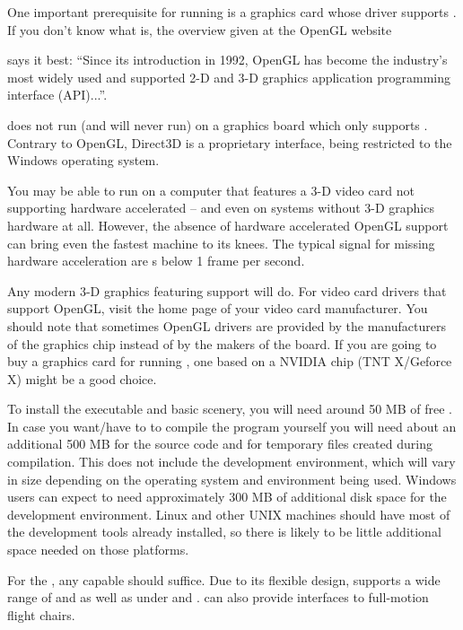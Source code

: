 One important prerequisite for running \FlightGear{} is a graphics card whose driver supports
. If you don't know what  is, the overview given at the OpenGL website
\medskip

\medskip

\noindent
 says it best: ``Since its introduction in 1992, OpenGL has become the
industry's most widely used and supported 2-D and 3-D graphics application programming
interface (API)...''.

\FlightGear{} does not run (and will never run) on a graphics board which only supports
. Contrary to OpenGL, Direct3D is a proprietary interface, being restricted to
the Windows operating system.

You may be able to run \FlightGear{} on a computer that features a 3-D video card not
supporting hardware accelerated  -- and even on systems without 3-D
graphics hardware at all. However, the absence of hardware accelerated OpenGL support can bring even the fastest machine to its knees. The typical signal for missing hardware acceleration
are s below 1 frame per second.

Any modern 3-D graphics featuring  support will do. For
 video card drivers that support OpenGL, visit the home page of your video
card manufacturer. You should note that sometimes OpenGL drivers
are provided by the manufacturers of the graphics chip instead of by the makers of the
board. If you are going to buy a graphics card for running \FlightGear{}, one based on a
NVIDIA chip (TNT X/Geforce X) might be a good choice.

To install the executable and basic scenery, you will need around 50 MB of free . In case you want/have to to compile the program yourself you will need about an additional
500 MB for the source code and for temporary files created during compilation. This does not
include the development environment, which will vary in size depending on the operating system
and environment being used.  Windows users can expect to need approximately 300 MB of additional
disk space for the development environment.  Linux and other UNIX machines should have most of
the development tools already installed, so there is likely to be little additional space
needed on those platforms.

For the , any capable  should suffice.
Due to its flexible design, \FlightGear{} supports a wide range of  and
 as well as  under  and . 
\FlightGear{} can also provide interfaces to full-motion flight chairs.

